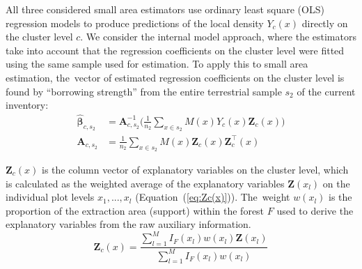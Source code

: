 \documentclass[remotesensing,article,accept,moreauthors,pdftex,10pt,a4paper]{Definitions/mdpi}
\begin{document}
All three considered small area estimators use ordinary least square (OLS) regression models to produce predictions of the local density $Y_{c}(x)$ directly on the cluster level $c$. We consider the internal model approach, where the estimators take into account that the regression coefficients on the cluster level were fitted using the same sample used for estimation. To apply this to small area estimation, the~vector of estimated regression coefficients on the cluster level is found by ``borrowing strength'' from the entire terrestrial sample $s_2$ of the current inventory:
\begin{subequations}\label{normequ_simple_cluster}
	\begin{align}
	\hat{\pmb{\beta}}_{c,s_2} & =  \pmb{A}_{c,s_2}^{-1} \Big(\frac{1}{n_2}\sum_{x\in{s_2}}M(x)Y_{c}(x)\pmb{Z}_{c}(x)\Big) \\
	\pmb{A}_{c,s_2} & = \frac{1}{n_2}\sum_{x\in{s_2}}M(x)\pmb{Z}_{c}(x)\pmb{Z}_{c}^{\top}(x)
	\end{align}
\end{subequations}

$\pmb{Z}_{c}(x)$ is the column vector of explanatory variables on the cluster level, which is calculated as the weighted average of the explanatory variables $\pmb{Z}(x_l)$ on the individual plot levels $x_1, ..., x_l$ (Equation~(\ref{eq:Zc(x)})). The~weight $w(x_l)$ is the proportion of the extraction area (support) within the forest $F$ used to derive the explanatory variables from the raw auxiliary information.
\begin{equation}\label{eq:Zc(x)}
\pmb{Z}_{c}(x) = \frac{\sum_{l = 1}^{M}I_{F}(x_l)w(x_l)\pmb{Z}(x_l)}{\sum_{l = 1}^{M}I_{F}(x_l)w(x_l)}
\end{equation}
\end{document}
